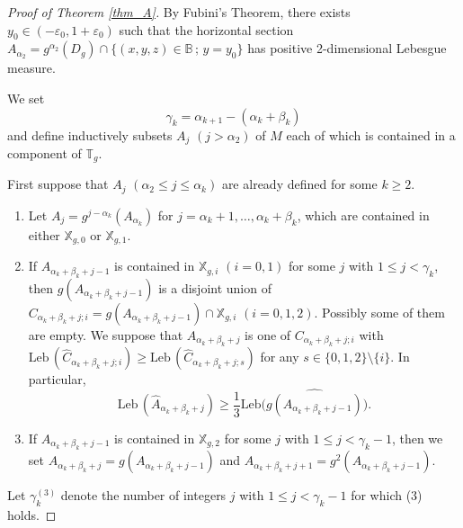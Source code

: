 \documentclass{amsart}
\theoremstyle{plain}
\theoremstyle{definition}
\theoremstyle{remark}
\numberwithin{equation}{section}
\def\xx{\mathbb{X}}
\begin{document}
\begin{proof}[Proof of Theorem \ref{thm_A}]
By Fubini's Theorem, there exists $y_0\in (-\varepsilon_0,1+\varepsilon_0)$ such that 
the horizontal section $A_{\alpha_2}=g^{\alpha_2}(D_g)\cap \{(x,y,z)\in\mathbb{B}\,;\, y=y_0\}$ has positive 2-dimensional Lebesgue measure.


We set
\[\gamma_k=\alpha_{k+1}-(\alpha_k+\beta_k)\]
and define inductively subsets $A_j$ $(j> \alpha_2)$ of $M$ each of which is contained in a component of $\mathbb{T}_g$.

First suppose that $A_j$ $(\alpha_2\leq j\leq \alpha_k)$ are already defined for some $k\geq 2$.
\begin{enumerate}[(1)]
\item
Let $A_j=g^{j-\alpha_k}(A_{\alpha_k})$ for $j=\alpha_k+1,\dots,\alpha_k+\beta_k$, 
which are contained in either $\mathbb{X}_{g,0}$ or $\mathbb{X}_{g,1}$.
\item
If $A_{\alpha_k+\beta_k+j-1}$ is contained in $\xx_{g,i}$ $(i=0,1)$ 
for some $j$ with $1\leq j< \gamma_k$, then 
$g(A_{\alpha_k+\beta_k+j-1})$ is a disjoint  union of $C_{\alpha_k+\beta_k+j;i}=
g(A_{\alpha_k+\beta_k+j-1})\cap \mathbb{X}_{g,i}$ $(i=0,1,2)$.
Possibly some of them are empty.
We suppose that $A_{\alpha_k+\beta_k+j}$ is one of $C_{\alpha_k+\beta_k+j;i}$ with 
$\mathrm{Leb}\,(\widehat C_{\alpha_k+\beta_k+j;i})\geq \mathrm{Leb}\,(\widehat C_{\alpha_k+\beta_k+j;s})
$ 
for any $s\in \{0,1,2\}\setminus \{i\}$.
In particular, 
\[
\mathrm{Leb}\,(\widehat A_{\alpha_k+\beta_k+j})\geq \frac13\mathrm{Leb}\bigl(\widehat{g(A_{\alpha_k+\beta_k+j-1})}\bigr).
\]
\item
If 
$A_{\alpha_k+\beta_k+j-1}$ is contained in $\xx_{g,2}$ for some $j$ with $1\leq j< \gamma_k-1$, then we set 
$A_{\alpha_k+\beta_k+j}=g(A_{\alpha_k+\beta_k+j-1})$ and $A_{\alpha_k+\beta_k+j+1}=g^2(A_{\alpha_k+\beta_k+j-1})$.
\end{enumerate}
Let $\gamma_k^{(3)}$ denote the number of integers $j$ with $1 \le j < \gamma_k - 1$ for which (3) holds.


\end{proof}
\end{document}
